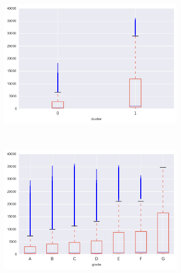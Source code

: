 \begin{anexosenv}
\begin{figure}[t!]
\begin{subfigure}[t]{0.5\textwidth}
            \centerline{\includegraphics[width=1.05\textwidth]{img/last_pymnt_amnt_by_cluster}}
        \end{subfigure}%
        ~ 
        \begin{subfigure}[t]{0.5\textwidth}
            \centering
   
            \centerline{\includegraphics[width=1.05\textwidth]{img/last_pymnt_amnt_by_grade}}

        \end{subfigure}
\\
                \caption{total\textunderscore rec\textunderscore prncp }
        \begin{subfigure}[t]{0.5\textwidth}
            \centering


\end{subfigure}
\end{figure}
\end{anexosenv}
